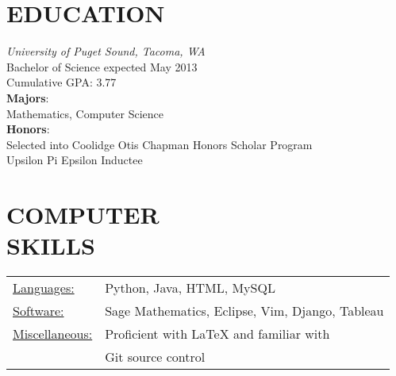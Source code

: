 \documentclass[line,margin]{res}
\begin{document}
\address{2214 N. Washington Street, Tacoma, WA 98406} 
\address{kwenholz@pugetsound.edu\hspace*{2mm} \vline \hspace*{2mm} (406)546-9210}

 
\begin{resume}
\vspace*{.3cm}

\section{EDUCATION} {\sl University of Puget Sound, Tacoma, WA} \\
                Bachelor of Science
                expected May 2013 \\
                Cumulative GPA: 3.77\\
                \textbf{Majors}: \\
\hspace*{5mm}                Mathematics, Computer Science \\
                \textbf{Honors}:\\
\hspace*{5mm}   Selected into Coolidge Otis Chapman Honors Scholar Program\\
\hspace*{5mm}   Upsilon Pi Epsilon Inductee\\

\vspace*{.2cm}

\section{COMPUTER \\ SKILLS}
\begin{tabular}{l l}
   \underline{Languages:} & Python, Java, HTML, MySQL\\
   \underline{Software:} & Sage Mathematics, Eclipse, Vim, Django, Tableau\\
   \underline{Miscellaneous:} & Proficient with LaTeX and familiar with\\
        & Git source control
  \end{tabular}

\vspace*{.2cm} 


\end{resume}
\end{document}
